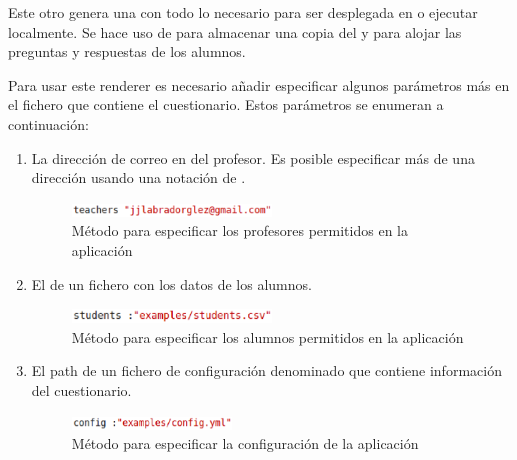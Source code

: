 

Este otro  genera una   con todo lo necesario para ser desplegada en  o ejecutar localmente. 
Se hace uso de  para almacenar una copia del  y para alojar las preguntas y respuestas de los alumnos.

Para usar este renderer es necesario a\~{n}adir especificar algunos par\'ametros m\'as en el fichero  que contiene el cuestionario.
Estos par\'ametros se enumeran a continuaci\'on:

\begin{enumerate}
  \item La direcci\'on de correo en  del profesor. Es posible especificar m\'as de una direcci\'on usando una notaci\'on
  de .
  \begin{figure}[!th]
  \begin{center}
  \includegraphics[width=0.5\textwidth]{images/teachers.eps}
  \caption{M\'etodo para especificar los profesores permitidos en la aplicaci\'on}
  \label{fig:teachers}
  \end{center}
  \end{figure}
  
  \item El  de un fichero \ceis{\ref{apend1:csv}} con los datos de los alumnos.
  \begin{figure}[!th]
  \begin{center}
  \includegraphics[width=0.5\textwidth]{images/students.eps}
  \caption{M\'etodo para especificar los alumnos permitidos en la aplicaci\'on}
  \label{fig:students}
  \end{center}
  \end{figure}
  \newpage
  
  \item El path de un fichero de configuraci\'on denominado  que contiene informaci\'on del cuestionario.
  \begin{figure}[!th]
  \begin{center}
  \includegraphics[width=0.4\textwidth]{images/config.eps}
  \caption{M\'etodo para especificar la configuraci\'on de la aplicaci\'on}
  \label{fig:config}
  \end{center}
  \end{figure}
  
\end{enumerate}

